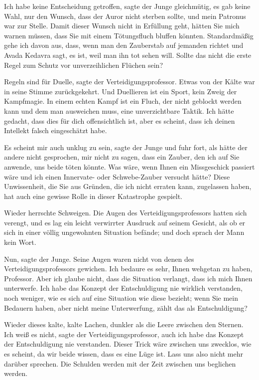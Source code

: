 \glqq Ich habe keine Entscheidung getroffen\grqq{}, sagte der Junge gleichmütig,
\glqq es gab keine Wahl, nur den Wunsch, dass der Auror nicht sterben sollte,
und mein Patronus war zur Stelle. Damit dieser Wunsch nicht in Erfüllung geht,
hätten Sie mich warnen müssen, dass Sie mit einem Tötungsfluch bluffen könnten.
Standardmäßig gehe ich davon aus, dass, wenn man den Zauberstab auf jemanden
richtet und Avada Kedavra sagt, es ist, weil man ihn tot sehen will. Sollte das
nicht die erste Regel zum Schutz vor unverzeihlichen Flüchen sein?\grqq{}

\glqq Regeln sind für Duelle\grqq{}, sagte der Verteidigungsprofessor. Etwas von
der Kälte war in seine Stimme zurückgekehrt. \glqq Und Duellieren ist ein Sport,
kein Zweig der Kampfmagie. In einem echten Kampf ist ein Fluch, der nicht
geblockt werden kann und dem man ausweichen muss, eine unverzichtbare Taktik.
Ich hätte gedacht, dass dies für dich offensichtlich ist, aber es scheint, dass
ich deinen Intellekt falsch eingeschätzt habe.\grqq{}

\glqq Es scheint mir auch unklug zu sein\grqq{}, sagte der Junge und fuhr fort,
als hätte der andere nicht gesprochen, \glqq mir nicht zu sagen, dass ein
Zauber, den ich auf Sie anwende, uns beide töten könnte. Was wäre, wenn Ihnen
ein Missgeschick passiert wäre und ich einen Innervate- oder Schwebe-Zauber
versucht hätte? Diese Unwissenheit, die Sie aus Gründen, die ich nicht erraten
kann, zugelassen haben, hat auch eine gewisse Rolle in dieser Katastrophe
gespielt.\grqq{}

Wieder herrschte Schweigen. Die Augen des Verteidigungsprofessors hatten sich
verengt, und es lag ein leicht verwirrter Ausdruck auf seinem Gesicht, als ob er
sich in einer völlig ungewohnten Situation befände; und doch sprach der Mann
kein Wort.

\glqq Nun\grqq{}, sagte der Junge. Seine Augen waren nicht von denen des
Verteidigungsprofessors gewichen. \glqq Ich bedaure es sehr, Ihnen wehgetan zu
haben, Professor. Aber ich glaube nicht, dass die Situation verlangt, dass ich
mich Ihnen unterwerfe. Ich habe das Konzept der Entschuldigung nie wirklich
verstanden, noch weniger, wie es sich auf eine Situation wie diese bezieht; wenn
Sie mein Bedauern haben, aber nicht meine Unterwerfung, zählt das als
Entschuldigung?\grqq{}

Wieder dieses kalte, kalte Lachen, dunkler als die Leere zwischen den Sternen.
\glqq Ich weiß es nicht\grqq{}, sagte der Verteidigungsprofessor, \glqq auch ich
habe das Konzept der Entschuldigung nie verstanden. Dieser Trick wäre zwischen
uns zwecklos, wie es scheint, da wir beide wissen, dass es eine Lüge ist. Lass
uns also nicht mehr darüber sprechen. Die Schulden werden mit der Zeit zwischen
uns beglichen werden.\grqq{}


